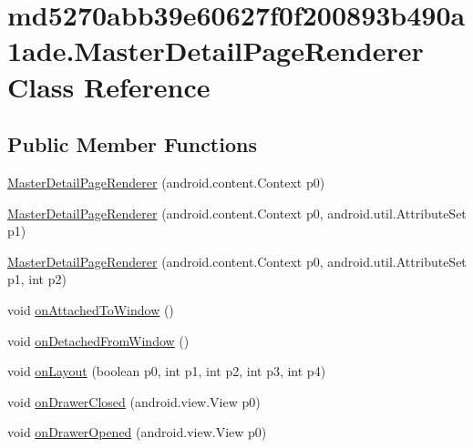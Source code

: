 \hypertarget{classmd5270abb39e60627f0f200893b490a1ade_1_1_master_detail_page_renderer}{
\section{md5270abb39e60627f0f200893b490a1ade.MasterDetailPageRenderer Class Reference}
\label{classmd5270abb39e60627f0f200893b490a1ade_1_1_master_detail_page_renderer}
}
\subsection*{Public Member Functions}
\begin{CompactItemize}
\item 
\hyperlink{classmd5270abb39e60627f0f200893b490a1ade_1_1_master_detail_page_renderer_2d9ba8d783e2532ed875ba9fcda99f6e}{MasterDetailPageRenderer} (android.content.Context p0)
\item 
\hyperlink{classmd5270abb39e60627f0f200893b490a1ade_1_1_master_detail_page_renderer_b7a70ecd01dd5f83f0df23ee11316a02}{MasterDetailPageRenderer} (android.content.Context p0, android.util.AttributeSet p1)
\item 
\hyperlink{classmd5270abb39e60627f0f200893b490a1ade_1_1_master_detail_page_renderer_cd2afc3edbdac35127b2980b773db408}{MasterDetailPageRenderer} (android.content.Context p0, android.util.AttributeSet p1, int p2)
\item 
void \hyperlink{classmd5270abb39e60627f0f200893b490a1ade_1_1_master_detail_page_renderer_0e38081a0adcf6e0526920a845a89255}{onAttachedToWindow} ()
\item 
void \hyperlink{classmd5270abb39e60627f0f200893b490a1ade_1_1_master_detail_page_renderer_c306b3abe0e030793a8b3770eb8cff33}{onDetachedFromWindow} ()
\item 
void \hyperlink{classmd5270abb39e60627f0f200893b490a1ade_1_1_master_detail_page_renderer_ea5f0c192c83f2cfc6c7ede79f81495f}{onLayout} (boolean p0, int p1, int p2, int p3, int p4)
\item 
void \hyperlink{classmd5270abb39e60627f0f200893b490a1ade_1_1_master_detail_page_renderer_3b3b26b7b29096785254d78ed482f84e}{onDrawerClosed} (android.view.View p0)
\item 
void \hyperlink{classmd5270abb39e60627f0f200893b490a1ade_1_1_master_detail_page_renderer_8f3d2e1cbbd6facc7a97f551d42aa406}{onDrawerOpened} (android.view.View p0)
\item 

\end{CompactItemize}
